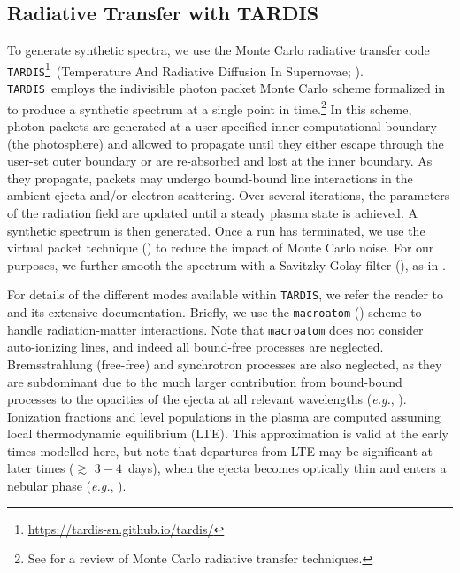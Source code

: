 \documentclass[twocolumn, twocolappendix]{aastex63}
\def\TARDIS{\texttt{TARDIS}}
\def\eg{{\it e.g.}}
\begin{document}
\subsection{Radiative Transfer with \textsc{TARDIS}}\label{ssc:TARDIS}

To generate synthetic spectra, we use the Monte Carlo radiative transfer code \TARDIS\footnote{\href{https://tardis-sn.github.io/tardis/}{https://tardis-sn.github.io/tardis/}}~(Temperature And Radiative Diffusion In Supernovae; \citealt{kerzendorf14}). \TARDIS~employs the indivisible photon packet Monte Carlo scheme formalized in \cite{mazzali93, lucy99, lucy02, lucy03} to produce a synthetic spectrum at a single point in time.\footnote{See \cite{noebauer19} for a review of Monte Carlo radiative transfer techniques.} In this scheme, photon packets are generated at a user-specified inner computational boundary (the photosphere) and allowed to propagate until they either escape through the user-set outer boundary or are re-absorbed and lost at the inner boundary. As they propagate, packets may undergo bound-bound line interactions in the ambient ejecta and/or electron scattering. Over several iterations, the parameters of the radiation field are updated until a steady plasma state is achieved. A synthetic spectrum is then generated. Once a run has terminated, we use the virtual packet technique (\citealt{long02}) to reduce the impact of Monte Carlo noise. For our purposes, we further smooth the spectrum with a Savitzky-Golay filter (\citealt{savitzky64}), as in \cite{vogl20}.


For details of the different modes available within \TARDIS, we refer the reader to \cite{kerzendorf14} and its extensive documentation. Briefly, we use the \texttt{macroatom} (\citealt{lucy02}) scheme to handle radiation-matter interactions. Note that \texttt{macroatom} does not consider auto-ionizing lines, and indeed all bound-free processes are neglected. Bremsstrahlung (free-free) and synchrotron processes are also neglected, as they are subdominant due to the much larger contribution from bound-bound processes to the opacities of the ejecta at all relevant wavelengths (\eg, \citealt{kasen13}). Ionization fractions and level populations in the plasma are computed assuming local thermodynamic equilibrium (LTE). This approximation is valid at the early times modelled here, but note that departures from LTE may be significant at later times ($\gtrsim$ $3-4$~days), when the ejecta becomes optically thin and enters a nebular phase (\eg, \citealt{gillanders21, hotokezaka21, pognan22a, pognan22b}).  
\end{document}

